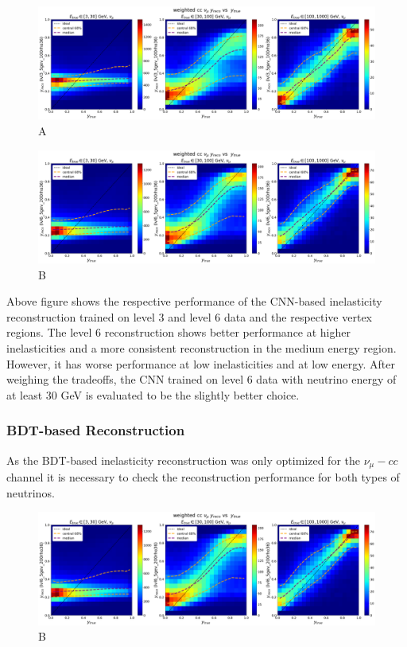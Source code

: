 \documentclass[a4paper,12pt,numbered]{article}
\begin{document}
\begin{figure}[H]
\centering
\includegraphics[width=\textwidth]{Graphics/Inelasticity/WithCentral68/weighted/weighted_cc_ytruevsyreco_lvl3_5gev_100rho36_numu.png}
\caption{A}
\end{figure}

\begin{figure}[H]
\centering
\includegraphics[width=\textwidth]{Graphics/Inelasticity/WithCentral68/weighted/weighted_cc_ytruevsyreco_lvl6_5gev_200rho36_numu.png}
\caption{B}
\end{figure}

Above figure shows the respective performance of the CNN-based inelasticity reconstruction trained on level 3 and level 6 data and the respective vertex regions. The level 6 reconstruction shows better performance at higher inelasticities and a more consistent reconstruction in the medium energy region. However, it has worse performance at low inelasticities and at low energy. After weighing the tradeoffs, the CNN trained on level 6 data with neutrino energy of at least 30 GeV is evaluated to be the slightly better choice.

\subsubsection{BDT-based Reconstruction}

As the BDT-based inelasticity reconstruction was only optimized for the $\nu_\mu-cc$ channel it is necessary to check the reconstruction performance for both types of neutrinos.

\begin{figure}[H]
\centering
\includegraphics[width=\textwidth]{Graphics/Inelasticity/WithCentral68/weighted/weighted_cc_ytruevsyreco_lvl6_5gev_200rho36_numu.png}
\caption{B}
\end{figure}
\end{document}
